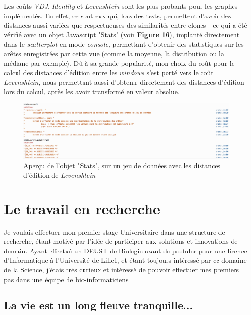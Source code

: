 \documentclass[pdftex,12pt,a4paper]{report}
\begin{document}
\begin{spacing}{1.2}
Les coûts \textit{VDJ}, \textit{Identity} et \textit{Levenshtein} sont les plus probants pour les graphes implémentés. En effet, ce sont eux qui, lors des tests, permettent d'avoir des distances aussi variées que respectueuses des similarités entre clones - ce qui a été vérifié avec un objet Javascript "Stats" (voir \textbf{Figure 16}), implanté directement dans le \textit{scatterplot} en mode \textit{console}, permettant d'obtenir des statistiques sur les arêtes enregistrées par cette vue (comme la moyenne, la distribution ou la médiane par exemple).
\newline
Dû à sa grande popularité, mon choix du coût pour le calcul des distances d'édition entre les \textit{windows} s'est porté vers le coût \textit{Levenshtein}, nous permettant aussi d'obtenir directement des distances d'édition lors du calcul, après les avoir transformé en valeur absolue.

\begin{figure}[H]
\begin{center}
	\includegraphics[scale=0.6]{img/Stats.jpg}
\end{center}
\caption{Aperçu de l'objet "Stats", sur un jeu de données avec les distances d'édition de \textit{Levenshtein}}
\end{figure}

\chapter{Le travail en recherche}

Je voulais effectuer mon premier stage Universitaire dans une structure de recherche, étant motivé par l'idée de participer aux solutions et innovations de demain. Ayant effectué un DEUST de Biologie avant de postuler pour une licence d'Informatique à l'Université de Lille1, et étant toujours intéressé par ce domaine de la Science, j'étais très curieux et intéressé de pouvoir effectuer mes premiers pas dans une équipe de bio-informaticiens

\section{La vie est un long fleuve tranquille...}


\end{spacing}
\end{document}
